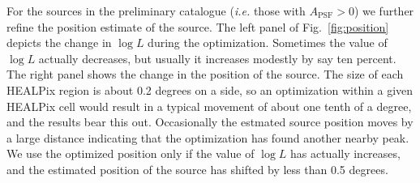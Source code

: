 \documentclass[useAMS,usenatbib]{mn2e}
\begin{document}
For the sources in the preliminary catalogue ({\em i.e.} those with
$A_\mathrm{PSF}>0$) we further refine the position estimate of the
source.  The left panel of Fig.~\ref{fig:position} depicts the change
in $\log L$ during the optimization.  Sometimes the value of $\log L$
actually decreases, but usually it increases modestly by say ten
percent.  The right panel shows the change in the position of the
source.  The size of each HEALPix region is about 0.2 degrees on a
side, so an optimization within a given HEALPix cell would result in a
typical movement of about one tenth of a degree, and the results bear
this out.  Occasionally the estmated source position moves by a
large distance indicating that the optimization has found another
nearby peak.  We use the optimized position only if the value of $\log
L$ has actually increases, and the estimated position of the source
has shifted by less than 0.5 degrees.
\end{document}
